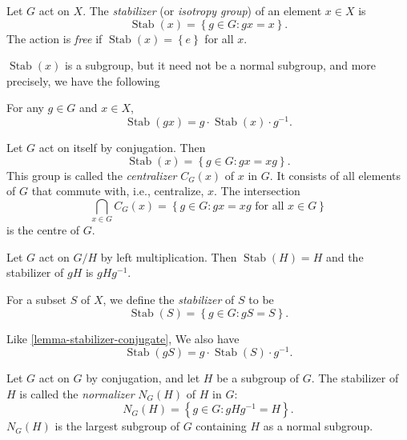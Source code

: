 \begin{definition}
  \label{definition-stabilizer}
  \label{definition-isotropy-group}
  \label{definition-free-action}
  Let \( G \) act on \( X \).
  The \emph{stabilizer} (or \emph{isotropy group}) of an element \( x \in X \) is
  \[
    \operatorname{Stab}(x) = \left\lbrace g \in G: gx = x \right\rbrace.
  \]
  The action is \emph{free} if \( \operatorname{Stab}(x) = \left\lbrace e \right\rbrace \) for all \( x \).
\end{definition}

\( \operatorname{Stab}(x) \) is a subgroup, but it need not be a normal subgroup, and more precisely, we have the following
\begin{lemma}
  \label{lemma-stabilizer-conjugate}
  For any \( g \in G \) and \( x \in X \),
  \[
    \operatorname{Stab}(gx) = g \cdot \operatorname{Stab}(x) \cdot g^{-1}.
  \]
\end{lemma}

\begin{definition}
  \label{definition-centralizer}
  Let \( G \) act on itself by conjugation.
  Then
  \[
    \operatorname{Stab}(x) = \left\lbrace g \in G: gx = xg \right\rbrace.
  \]
  This group is called the \emph{centralizer} \( C_G(x) \) of \( x \) in \( G \).
  It consists of all elements of \( G \) that commute with, i.e., centralize, \( x \).
  The intersection
  \[
    \bigcap_{x \in G} C_G(x) = \left\lbrace g \in G: gx = xg \text{ for all } x \in G \right\rbrace
  \]
  is the centre of \( G \).
\end{definition}

\begin{example}
  \label{example-stabilizer-of-coset}
  Let \( G \) act on \( G / H \) by left multiplication.
  Then \( \operatorname{Stab}(H) = H \) and the stabilizer of \( gH \) is \( gHg^{-1} \).
\end{example}

\begin{definition}
  \label{definition-stabilizer-of-subset}
  For a subset \( S \) of \( X \), we define the \emph{stabilizer} of \( S \) to be
  \[
    \operatorname{Stab}(S) = \left\lbrace g \in G: gS = S \right\rbrace.
  \]
\end{definition}
Like \ref{lemma-stabilizer-conjugate}, We also have
\[
    \operatorname{Stab}(gS) = g \cdot \operatorname{Stab}(S) \cdot g^{-1}.
\]

\begin{definition}
  \label{definition-normalizer}
  Let \( G \) act on \( G \) by conjugation, and let \( H \) be a subgroup of \( G \).
  The stabilizer of \( H \) is called the \emph{normalizer} \( N_G(H) \) of \( H \) in \( G \):
  \[
    N_G(H) = \left\lbrace g \in G: g H g^{-1} = H \right\rbrace.
  \]
  \( N_G(H) \) is the largest subgroup of \( G \) containing \( H \) as a normal subgroup.
\end{definition}


